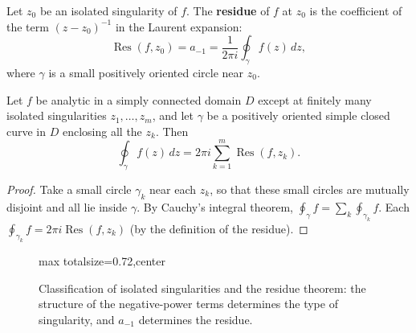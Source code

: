 \begin{definition}[Residue]\label{def:residue}
Let $z_0$ be an isolated singularity of $f$. The \textbf{residue} of $f$ at $z_0$ is the coefficient of the term $(z-z_0)^{-1}$ in the Laurent expansion:
\[
\operatorname{Res}(f, z_0) = a_{-1} = \frac{1}{2\pi i} \oint_\gamma f(z)\,dz,
\]
where $\gamma$ is a small positively oriented circle near $z_0$.
\end{definition}

\begin{theorem}\label{thm:residue_theorem}
Let $f$ be analytic in a simply connected domain $D$ except at finitely many isolated singularities $z_1, \dots, z_m$, and let $\gamma$ be a positively oriented simple closed curve in $D$ enclosing all the $z_k$. Then
\[
\oint_\gamma f(z)\,dz = 2\pi i \sum_{k=1}^{m} \operatorname{Res}(f, z_k).
\]
\end{theorem}

\begin{proof}
Take a small circle $\gamma_k$ near each $z_k$, so that these small circles are mutually disjoint and all lie inside $\gamma$. By Cauchy's integral theorem, $\oint_\gamma f = \sum_k \oint_{\gamma_k} f$. Each $\oint_{\gamma_k} f = 2\pi i \operatorname{Res}(f, z_k)$ (by the definition of the residue).
\end{proof}

\begin{figure}[htbp]
\centering
\begin{adjustbox}{max totalsize={\linewidth}{0.72\textheight},center}
\end{adjustbox}
\caption{Classification of isolated singularities and the residue theorem: the structure of the negative-power terms determines the type of singularity, and $a_{-1}$ determines the residue.}
\label{fig:singularity_residue}
\end{figure}

